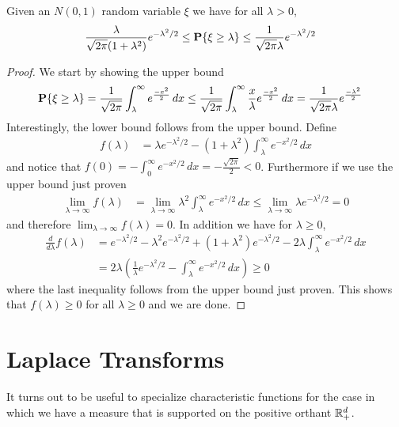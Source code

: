 \begin{lem}\label{GaussianTailsElementary}Given an $N(0,1)$ random
  variable $\xi$ we have for all $\lambda > 0$, 
\begin{align*}
\frac{\lambda}{\sqrt{2\pi}(1+\lambda^2)} e^{-\lambda^2/2}&\leq \textbf{P}\{\xi \geq
    \lambda\} \leq \frac{1}{\sqrt{2\pi} \lambda} e^{-\lambda^2/2}
\end{align*}
\end{lem}
\begin{proof}
We start by showing the upper bound 
\begin{align*}
\textbf{P}\{\xi \geq \lambda\} &= \frac{1}{\sqrt{2\pi}} \int_\lambda^\infty
e^{\frac{-x^2}{2}} \, dx 
\leq  \frac{1}{\sqrt{2\pi}} \int_\lambda^\infty
\frac{x}{\lambda} e^{\frac{-x^2}{2}} \, dx 
= \frac{1}{\sqrt{2\pi}\lambda} e^{\frac{-\lambda^2}{2}}
\end{align*}
Interestingly, the lower bound follows from the upper bound.  Define 
\begin{align*}
f(\lambda) &= \lambda e^{-\lambda^2/2} - (1 + \lambda^2)
\int_\lambda^\infty e^{-x^2/2} \, dx
\end{align*}
and notice that $f(0) = -\int_0^\infty e^{-x^2/2} \, dx =
-\frac{\sqrt{2\pi}}{2} < 0$.  Furthermore if we use the upper bound
just proven
\begin{align*}
\lim_{\lambda \to \infty} f(\lambda)
&= \lim_{\lambda \to \infty} \lambda^2 \int_\lambda^\infty e^{-x^2/2}
\, dx \leq \lim_{\lambda \to \infty} \lambda e^{-\lambda^2/2} = 0
\end{align*}
and therefore $\lim_{\lambda \to \infty} f(\lambda) = 0$.  In addition
we have for $\lambda \geq 0$,
\begin{align*}
\frac{d}{d\lambda} f(\lambda) &= e^{-\lambda^2/2} - \lambda^2
e^{-\lambda^2/2} + (1+\lambda^2) e^{-\lambda^2/2} -2\lambda
\int_\lambda^\infty e^{-x^2/2} \, dx \\
&=2\lambda \left(\frac{1}{\lambda}e^{-\lambda^2/2} -
  \int_\lambda^\infty e^{-x^2/2} \, dx \right ) \geq 0
\end{align*}
where the last inequality follows from the upper bound just proven.
This shows that $f(\lambda) \geq 0$ for all $\lambda \geq 0$ and we
are done.
\end{proof}

\section{Laplace Transforms}
It turns out to be useful to specialize characteristic functions for
the case in which we have a measure that is supported on the positive
orthant $\mathbb{R}^d_+$.  

